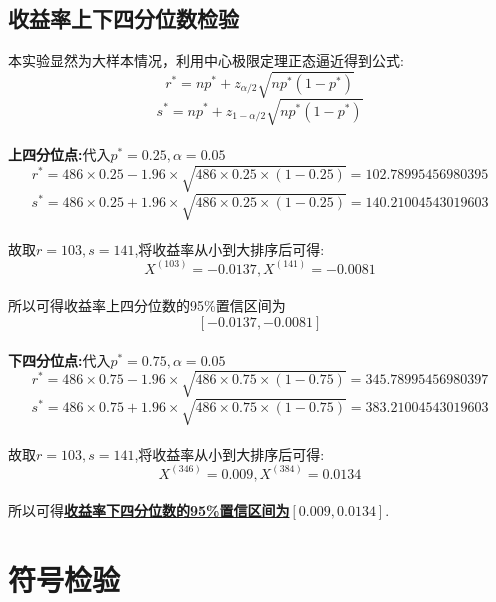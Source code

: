 \documentclass[a4paper, 11pt]{article}
\begin{document}
	\subsection{收益率上下四分位数检验}
	本实验显然为大样本情况，利用中心极限定理正态逼近得到公式:
	$$r^{*}=np^{*}+z_{\alpha/2}\sqrt{np^{*}(1-p^{*})}$$
	$$s^{*}=np^{*}+z_{1-\alpha/2}\sqrt{np^{*}(1-p^{*})}$$
	\\\textbf{上四分位点:}代入$p^{*}=0.25,\alpha=0.05$
	$$r^{*}=486\times 0.25-1.96\times \sqrt{486\times 0.25\times (1-0.25)}=102.78995456980395$$
	$$s^{*}=486\times 0.25+1.96\times \sqrt{486\times 0.25\times (1-0.25)}=140.21004543019603$$
	\\故取$r=103,s=141$,将收益率从小到大排序后可得:
	$$X^{(103)}=-0.0137,X^{(141)}=-0.0081$$
	\\所以可得收益率上四分位数的95\%置信区间为
	$$[-0.0137,-0.0081]$$
	\\\textbf{下四分位点:}代入$p^{*}=0.75,\alpha=0.05$
	$$r^{*}=486\times 0.75-1.96\times \sqrt{486\times 0.75\times (1-0.75)}=345.78995456980397$$
	$$s^{*}=486\times 0.75+1.96\times \sqrt{486\times 0.75\times (1-0.75)}=383.21004543019603$$
	\\故取$r=103,s=141$,将收益率从小到大排序后可得:
	$$X^{(346)}=0.009,X^{(384)}=0.0134$$
	\\所以可得\textbf{\underline{收益率下四分位数的95\%置信区间为$[0.009,0.0134]$}}.
	\section{符号检验}
\end{document}
